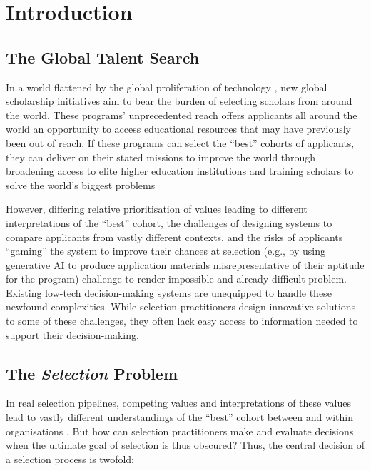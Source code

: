 

\chapter{\label{ch:intro}Introduction} 

\minitoc

\section{The Global Talent Search}
In a world flattened by the global proliferation of technology \cite{citation needed}, new global scholarship initiatives aim to bear the burden of selecting scholars from around the world. These programs' unprecedented reach offers applicants all around the world an opportunity to access educational resources that may have previously been out of reach. If these programs can select the ``best'' cohorts of applicants, they can deliver on their stated missions to improve the world through broadening access to elite higher education institutions and training scholars to solve the world's biggest problems

However, differing relative prioritisation of values leading to different interpretations of the ``best'' cohort, the challenges of designing systems to compare applicants from vastly different contexts, and the risks of applicants ``gaming'' the system to improve their chances at selection (e.g., by using generative AI to produce application materials misrepresentative of their aptitude for the program) challenge to render impossible and already difficult problem. Existing low-tech decision-making systems are unequipped to handle these newfound complexities. While selection practitioners design innovative solutions to some of these challenges, they often lack easy access to information needed to support their decision-making.

\section{The \emph{Selection} Problem}
In real selection pipelines, competing values and interpretations of these values lead to vastly different understandings of the ``best'' cohort between and within organisations \cite{citation needed}. But how can selection practitioners make and evaluate decisions when the ultimate goal of selection is thus obscured? Thus, the central decision of a selection process is twofold: 

